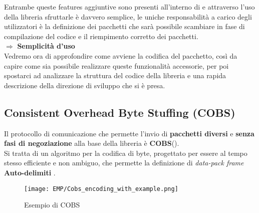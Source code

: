 \noindent
Entrambe queste features aggiuntive sono presenti all'interno di \cite*{EMP} e attraverso l'uso della libreria sfruttarle è davvero semplice, le uniche responsabilità a carico degli utilizzatori è la definizione dei pacchetti che sarà possibile scambiare in fase di compilazione del codice e il riempimento corretto dei pacchetti.\\
\phantom{.}\hfill$\Rightarrow$ \textbf{Semplicità d'uso}\\
Vedremo ora di approfondire come avviene la codifica del pacchetto, così da capire come sia possibile realizzare queste funzionalità accessorie, per poi spostarci ad analizzare la struttura del codice della libreria e una rapida descrizione della direzione di sviluppo che si è presa. 

\newpage

\subsection*{Consistent Overhead Byte Stuffing (COBS)}
Il protocollo di comunicazione che permette l’invio di \textbf{pacchetti diversi} e \textbf{senza fasi di negoziazione} alla base della libreria è \textbf{COBS}(\cite{COBS}).\\
Si tratta di un algoritmo per la codifica di byte, progettato per essere al tempo stesso efficiente e non ambiguo, che permette la definizione di \textit{data-pack frame} \textbf{Auto-delimiti} .

\begin{figure}[H]
	\centering
	\caption[Esempio di COBS]{Esempio di COBS}
	\texttt{[image: EMP/Cobs\_encoding\_with\_example.png]}
\end{figure}

